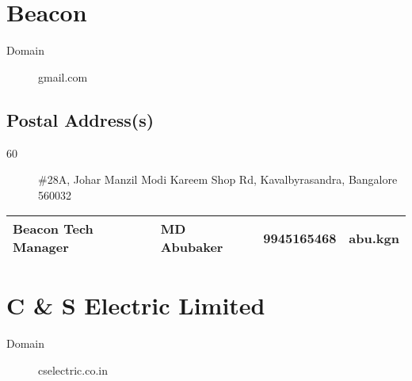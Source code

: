 \documentclass[a4paper, 11pt, twoside]{book}
\begin{document}
\section{Beacon}\label{com:42}
\begin{description}
\item[Domain]gmail.com
\end{description}
\subsection*{Postal Address(s)}
\begin{description}
\item [60]\#28A, Johar Manzil Modi Kareem Shop Rd, Kavalbyrasandra, Bangalore 560032
\end{description}
\begin{tabular}{|p{4cm}|p{2cm}|p{2cm}|p{3cm}|}
\hline
Beacon Tech Manager & MD Abubaker & 9945165468 & abu.kgn \\ \hline
\end{tabular}
\section{C \& S Electric Limited}\label{com:3}
\begin{description}
\item[Domain]cselectric.co.in
\end{description}
\end{document}
